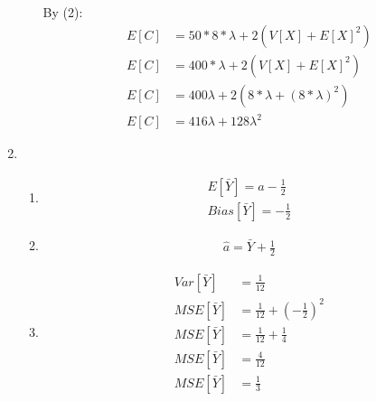\documentclass{article}
\begin{document}
\begin{enumerate}
\begin{enumerate}
By (2):
\begin{equation*}
\begin{split}
E[C] &= 50*8*\lambda + 2(V[X]+E[X]^{2}) \\
E[C] &= 400*\lambda + 2(V[X]+E[X]^{2}) \\
E[C] &= 400\lambda + 2(8*\lambda + (8*\lambda)^{2})\\
E[C] &= 416\lambda+128\lambda^{2}
\end{split}
\end{equation*}
\end{enumerate}
\item
\begin{enumerate}
\item
\begin{equation*}
\begin{split}
E[\bar{Y}] = a-\frac{1}{2} \\
Bias[\bar{Y}] = -\frac{1}{2}
\end{split}
\end{equation*}
\item
\begin{equation*}
\begin{split}
\hat{a} = \bar{Y} + \frac{1}{2}
\end{split}
\end{equation*}
\item
\begin{equation*}
\begin{split}
Var[\bar{Y}] &= \frac{1}{12} \\
MSE[\bar{Y}] &= \frac{1}{12} + (-\frac{1}{2})^{2} \\
MSE[\bar{Y}] &= \frac{1}{12} + \frac{1}{4} \\
MSE[\bar{Y}] &= \frac{4}{12} \\
MSE[\bar{Y}] &= \frac{1}{3}
\end{split}
\end{equation*}
\end{enumerate}
\end{enumerate}
\end{document}
